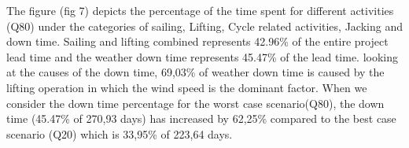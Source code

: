 The figure (fig 7) depicts the percentage of the time spent for different activities (Q80) under the categories of sailing, Lifting, Cycle related activities, Jacking and down time. Sailing and lifting combined represents 42.96\% of the entire project lead time and the weather down time represents 45.47\% of the lead time. looking at the causes of the down time, 69,03\% of weather down time is caused by the lifting operation in which the wind speed is the dominant factor. When we consider the down time percentage for the worst case scenario(Q80), the down time (45.47\% of 270,93 days) has increased by 62,25\% compared to the best case scenario (Q20) which is 33,95\% of 223,64 days.